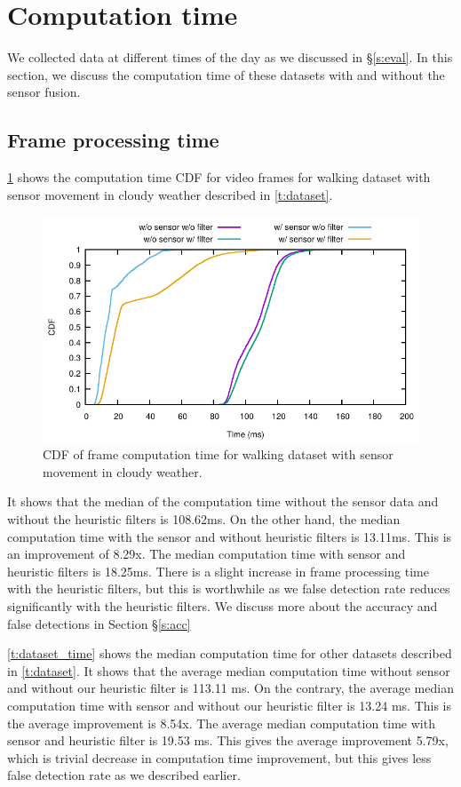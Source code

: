 \section{Computation time}
We collected data at different times of the day as we discussed in \S\ref{s:eval}.
In this section, we discuss the computation time of these datasets with and without the sensor fusion.

\subsection{Frame processing time}
\ref{f:cdf_cloudy} shows the computation time CDF for video frames for walking dataset with sensor movement in cloudy weather described in \ref{t:dataset}.
\begin{figure}[ht]
\centering
\includegraphics[width=5.2in]{plots/cloudy_cdf.pdf}
\caption{CDF of frame computation time for walking dataset with sensor movement in cloudy weather.}
\label{f:cdf_cloudy}
\end{figure}
It shows that the median of the computation time without the sensor data and without the heuristic filters is 108.62ms.
On the other hand, the median computation time with the sensor and without heuristic filters is 13.11ms.
This is an improvement of 8.29x.
The median computation time with sensor and heuristic filters is 18.25ms.
There is a slight increase in frame processing time with the heuristic filters, but this is worthwhile as we false detection rate reduces significantly with the heuristic filters.  
We discuss more about the accuracy and false detections in Section \S\ref{s:acc}

\ref{t:dataset_time} shows the median computation time for other datasets described in \ref{t:dataset}.
It shows that the average median computation time without sensor and without our heuristic filter is 113.11 ms.
On the contrary, the average median computation time with sensor and without our heuristic filter is 13.24 ms.
This is the average improvement is 8.54x.
The average median computation time with sensor and heuristic filter is 19.53 ms.
This gives the average improvement 5.79x, which is trivial decrease in computation time improvement, but this gives less false detection rate as we described earlier.


